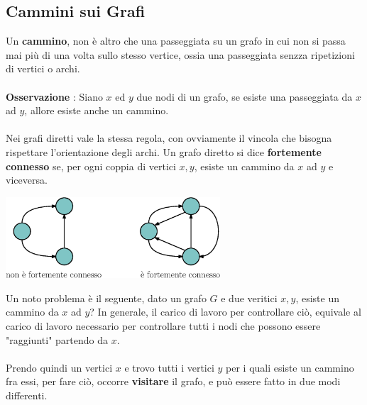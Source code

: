 \documentclass[12pt, letterpaper]{article}
\newcommand{\acc}{\\\hphantom{}\\}
\begin{document}
\subsection{Cammini sui Grafi}
Un \textbf{cammino}, non è altro che una passeggiata su un grafo in cui non
si passa mai più di una volta sullo stesso vertice, ossia una passeggiata
senzza ripetizioni di vertici o archi. \acc
\textbf{Osservazione} : Siano $x$ ed $y$ due nodi di un grafo, se esiste
una passeggiata da $x$ ad $y$, allore esiste anche un cammino.\acc
Nei grafi diretti vale la stessa regola, con ovviamente il vincola che bisogna rispettare
l'orientazione degli archi. Un grafo diretto si dice \textbf{fortemente connesso}
se, per ogni coppia di vertici \(x,y\), esiste un cammino da \(x\) ad \(y\)
e viceversa. \begin{center}
    \includegraphics[width=0.6\textwidth ]{images/fortConnesso.eps}
\end{center}
Un noto problema è il seguente, dato un grafo \(G\) e due veritici \(x,y\), esiste un cammino da \(x\) ad \(y\)? In generale,
il carico di lavoro per controllare ciò, equivale al carico di lavoro necessario per controllare tutti i nodi che possono essere
"raggiunti" partendo da \(x\).\acc
Prendo quindi un vertici \(x\) e trovo tutti i vertici \(y\) per i quali esiste un cammino fra essi, per fare ciò, occorre
\textbf{visitare} il grafo, e può essere fatto in due modi differenti.
\end{document}
